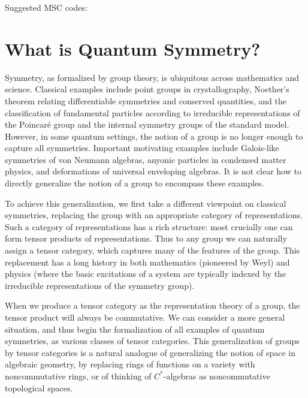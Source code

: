 \documentclass[12pt]{article}
\begin{document}
Suggested MSC codes:

\section{What is Quantum Symmetry?}

Symmetry, as formalized by group theory, is ubiquitous across mathematics and science. Classical examples include point groups in crystallography, Noether's theorem relating differentiable symmetries and conserved quantities, and the classification of fundamental particles according to irreducible representations of the Poincar\'e group and the internal symmetry groups of the standard model. However, in some quantum settings, the notion of a group is no longer enough to capture all symmetries.  Important motivating examples include Galois-like symmetries of von Neumann algebras, anyonic particles in condensed matter physics, and deformations of universal enveloping algebras. It is not clear how to directly generalize the notion of a group to encompass these examples.

To achieve this generalization, we first take a different viewpoint on classical symmetries, replacing the group with an appropriate category of representations.  Such a category of representations has a rich structure: most crucially one can form tensor products of representations.  Thus to any group we can naturally assign a tensor category, which captures many of the features of the group. This replacement has a long history in both mathematics (pioneered by Weyl) and physics (where the basic excitations of a system are typically indexed by the irreducible representations of the symmetry group).

When we produce a tensor category as the representation theory of a group, the tensor product will always be commutative. We can consider a more general situation, and thus begin the formalization of all examples of quantum symmetries, as various classes of tensor categories.  This generalization of groups by tensor categories is a natural analogue of generalizing the notion of space in algebraic geometry, by replacing rings of functions on a variety with noncommutative rings, or of thinking of $C^*$-algebras as noncommutative topological spaces.
\end{document}
